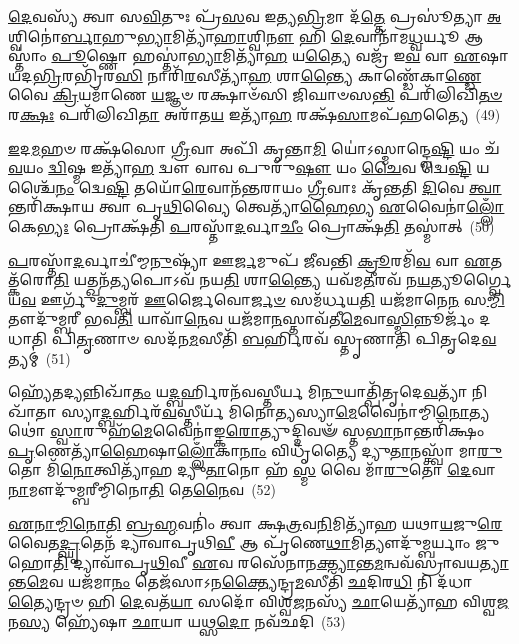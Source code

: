 {\anuvakamend[{𑌪𑌤𑍍𑌨𑍀᳴ 𑌹𑌨𑍍𑌯𑍁𑌰𑍍𑌵𑌾 𑌪𑍃\-\ul{𑌥𑌿}\-𑌵𑍍𑌯𑌾 𑌵𑌿𑌷𑍍𑌯𑍂᳴\-\ul{𑌤𑌂} 𑌵𑌿\-\ul{𑌷𑍍𑌣𑍋𑌃} 𑌷𑌡𑍍𑌵𑌿𑍞᳴𑌶𑌤𑌿𑌶𑍍𑌚}]}%

\-\ul{𑌦𑍇}\-𑌵𑌸𑍍𑌯᳴ 𑌤𑍍𑌵𑌾 𑌸\-\ul{𑌵𑌿}\-𑌤𑍁𑌃 𑌪𑍍𑌰᳴\-\ul{𑌸}\-𑌵 𑌇𑌤𑍍𑌯\-\ul{𑌭𑍍𑌰𑌿}\-𑌮𑌾 𑌦᳴\-\ul{𑌤𑍍𑌤𑍇} 𑌪𑍍𑌰𑌸𑍂॑𑌤𑍍𑌯𑌾 \ul{𑌅}\-𑌶𑍍𑌵𑌿𑌨𑍋॑\-\ul{𑌰𑍍𑌬𑌾}\-𑌹𑍁\-\ul{𑌭𑍍𑌯𑌾}\-𑌮𑌿𑌤𑍍𑌯𑌾᳴\-\ul{𑌹𑌾}\-𑌶𑍍𑌵𑌿\-\ul{𑌨𑍗} 𑌹𑌿 \ul{𑌦𑍇}\-𑌵𑌾𑌨𑌾᳴𑌮\-\ul{𑌧𑍍𑌵}\-𑌰𑍍𑌯𑍂 𑌆𑌸𑍍𑌤𑌾𑌂॑ \ul{𑌪𑍂}\-𑌷𑍍𑌣𑍋 𑌹𑌸𑍍𑌤𑌾॑\-\ul{𑌭𑍍𑌯𑌾}\-𑌮𑌿𑌤𑍍𑌯𑌾᳴\-\ul{𑌹} 𑌯\-\ul{𑌤𑍍𑌯𑍈} 𑌵𑌜𑍍𑌰᳴ 𑌇\-\ul{𑌵} 𑌵𑌾 \ul{𑌏}\-𑌷𑌾 𑌯𑌦\-\ul{𑌭𑍍𑌰𑌿}\-𑌰𑌭𑍍𑌰𑌿᳴𑌰\-\ul{𑌸𑌿} 𑌨𑌾𑌰𑌿᳴\-\ul{𑌰}\-𑌸𑍀𑌤𑍍𑌯𑌾᳴\-\ul{𑌹} 𑌶𑌾\-\ul{𑌨𑍍𑌤𑍍𑌯𑍈} 𑌕𑌾𑌣𑍍𑌡𑍇᳴𑌕𑌾\-\ul{𑌣𑍍𑌡𑍇} 𑌵𑍈 \ul{𑌕𑍍𑌰𑌿}\-𑌯𑌮𑌾᳴𑌣𑍇 \ul{𑌯}\-𑌜𑍍𑌞𑍞 𑌰𑌕𑍍𑌷𑌾𑍞᳴𑌸𑌿 𑌜𑌿𑌘𑌾𑍞𑌸\-\ul{𑌨𑍍𑌤𑌿} 𑌪𑌰𑌿᳴𑌲𑌿𑌖𑌿\-\ul{𑌤}\-\-\ul{𑍞} 𑌰\-\ul{𑌕𑍍𑌷𑌃} 𑌪𑌰𑌿᳴𑌲𑌿𑌖𑌿\-\ul{𑌤𑌾} 𑌅𑌰𑌾᳴𑌤\-\ul{𑌯} 𑌇𑌤𑍍𑌯𑌾᳴\-\ul{𑌹} 𑌰𑌕𑍍𑌷᳴\-\ul{𑌸𑌾}\-𑌮𑌪᳴𑌹𑌤𑍍𑌯𑍈~(49)

\-\ul{𑌇}\-𑌦\-\ul{𑌮}\-𑌹𑍞 𑌰𑌕𑍍𑌷᳴𑌸𑍋 \ul{𑌗𑍍𑌰𑍀}\-𑌵𑌾 𑌅𑌪𑌿᳴ 𑌕𑍃𑌨𑍍𑌤𑌾\-\ul{𑌮𑌿} 𑌯𑍋॑\-𑌽𑌸𑍍𑌮𑌾𑌨𑍍𑌦𑍍𑌵𑍇\-\ul{𑌷𑍍𑌟𑌿} 𑌯𑌂 𑌚᳴ \ul{𑌵}\-𑌯𑌂 \ul{𑌦𑍍𑌵𑌿}\-𑌷𑍍𑌮 𑌇𑌤𑍍𑌯𑌾᳴\-\ul{𑌹} 𑌦𑍍𑌵𑍗 𑌵𑌾𑌵 𑌪𑍁𑌰𑍁᳴\-\ul{𑌷𑍗} 𑌯𑌂 \ul{𑌚𑍈}\-𑌵 𑌦𑍍𑌵𑍇\-\ul{𑌷𑍍𑌟𑌿} 𑌯𑌶𑍍𑌚𑍈᳴\-\ul{𑌨𑌂} 𑌦𑍍𑌵𑍇\-\ul{𑌷𑍍𑌟𑌿} 𑌤𑌯𑍋᳴\-\ul{𑌰𑍇}\-𑌵𑌾𑌨᳴𑌨𑍍𑌤𑌰𑌾𑌯𑌂 \ul{𑌗𑍍𑌰𑍀}\-𑌵𑌾𑌃 𑌕𑍃᳴𑌨𑍍𑌤𑌤𑌿 \ul{𑌦𑌿}\-𑌵𑍇 \ul{𑌤𑍍𑌵𑌾}\-𑌨𑍍𑌤𑌰𑌿᳴𑌕𑍍𑌷𑌾𑌯 𑌤𑍍𑌵𑌾 𑌪𑍃\-\ul{𑌥𑌿}\-𑌵𑍍𑌯𑍈 𑌤𑍍𑌵𑍇𑌤𑍍𑌯𑌾᳴\-\ul{𑌹𑍈}\-𑌭𑍍𑌯 \ul{𑌏}\-𑌵𑍈𑌨𑌾॑\-\ul{𑌲𑍍𑌲𑍋𑌁}\-𑌕𑍇\-\ul{𑌭𑍍𑌯𑌃} 𑌪𑍍𑌰𑍋𑌕𑍍𑌷᳴𑌤𑌿 \ul{𑌪}\-𑌰𑌸𑍍𑌤𑌾᳴\-\ul{𑌦}\-𑌰𑍍𑌵𑌾\-\ul{𑌚𑍀𑌂} 𑌪𑍍𑌰𑍋𑌕𑍍𑌷᳴\-\ul{𑌤𑌿} 𑌤𑌸𑍍𑌮𑌾॑𑌤𑍍~(50)

\-\ul{𑌪}\-𑌰𑌸𑍍𑌤𑌾᳴\-\ul{𑌦}\-𑌰𑍍𑌵𑌾𑌚𑍀॑𑌮𑍍𑌮\-\ul{𑌨𑍁}\-𑌷𑍍𑌯𑌾᳴ 𑌊\-\ul{𑌰𑍍𑌜}\-𑌮𑍁𑌪᳴ 𑌜𑍀𑌵𑌨𑍍𑌤𑌿 \ul{𑌕𑍍𑌰𑍂}\-𑌰𑌮𑌿᳴\-\ul{𑌵} 𑌵𑌾 \ul{𑌏}\-𑌤𑌤𑍍𑌕᳴𑌰𑍋\-\ul{𑌤𑌿} 𑌯𑌤𑍍𑌖𑌨᳴\-\ul{𑌤𑍍𑌯}\-𑌪𑍋\-𑌽𑌵᳴ 𑌨𑌯\-\ul{𑌤𑌿} 𑌶𑌾\-\ul{𑌨𑍍𑌤𑍍𑌯𑍈} 𑌯𑌵᳴𑌮\-\ul{𑌤𑍀}\-𑌰𑌵᳴ 𑌨\-\ul{𑌯}\-𑌤𑍍𑌯𑍂𑌰𑍍𑌗𑍍𑌵𑍈 𑌯\-\ul{𑌵} 𑌊𑌰𑍍𑌗𑍁᳴\-\ul{𑌦𑍁}\-𑌮𑍍𑌬𑌰᳴ \ul{𑌊}\-𑌰𑍍𑌜𑍈𑌵𑍋\-\ul{𑌰𑍍𑌜}\-\-\ul{𑍞} 𑌸𑌮᳴𑌰𑍍𑌧𑌯\-\ul{𑌤𑌿} 𑌯𑌜᳴𑌮𑌾𑌨𑍇\-\ul{𑌨} 𑌸\-\ul{𑌮𑍍𑌮𑌿}\-𑌤𑍗𑌦𑍁᳴𑌮𑍍𑌬𑌰𑍀 𑌭𑌵\-\ul{𑌤𑌿} 𑌯𑌾𑌵𑌾᳴\-\ul{𑌨𑍇}\-𑌵 𑌯𑌜᳴𑌮𑌾\-\ul{𑌨}\-𑌸𑍍𑌤𑌾𑌵᳴𑌤𑍀\-\ul{𑌮𑍇}\-𑌵𑌾\-\ul{𑌸𑍍𑌮𑌿}\-𑌨𑍍𑌨𑍂𑌰𑍍𑌜𑌂᳴ 𑌦𑌧𑌾𑌤𑌿 𑌪𑌿\-\ul{𑌤𑍃}\-𑌣𑌾𑍞 𑌸𑌦᳴𑌨\-\ul{𑌮}\-𑌸𑍀𑌤𑌿᳴ \ul{𑌬}\-𑌰𑍍\mbox{}𑌹𑌿𑌰𑌵᳴ 𑌸𑍍𑌤𑍃𑌣𑌾𑌤𑌿 𑌪𑌿𑌤𑍃𑌦𑍇\-\ul{𑌵}\-𑌤𑍍𑌯𑌮𑍍॑~(51)

𑌹𑍍𑌯𑍇᳴𑌤𑌦𑍍𑌯𑌨𑍍𑌨𑌿𑌖𑌾᳴\-\ul{𑌤𑌂} 𑌯\-\ul{𑌦𑍍𑌬}\-𑌰𑍍\mbox{}𑌹𑌿𑌰𑌨᳴𑌵𑌸𑍍𑌤𑍀𑌰𑍍𑌯 𑌮𑌿\-\ul{𑌨𑍁}\-𑌯𑌾𑌤𑍍𑌪𑌿᳴𑌤𑍃𑌦𑍇\-\ul{𑌵}\-𑌤𑍍𑌯𑌾᳴ 𑌨𑌿𑌖𑌾᳴𑌤𑌾 𑌸𑍍𑌯𑌾\-\ul{𑌦𑍍𑌬}\-𑌰𑍍\mbox{}𑌹𑌿𑌰᳴\-\ul{𑌵}\-𑌸𑍍𑌤𑍀𑌰𑍍𑌯᳴ 𑌮𑌿𑌨𑍋\-\ul{𑌤𑍍𑌯}\-𑌸𑍍𑌯𑌾\-\ul{𑌮𑍇}\-𑌵𑍈𑌨𑌾॑𑌮𑍍𑌮𑌿\-\ul{𑌨𑍋}\-𑌤𑍍𑌯𑌥𑍋॑ \ul{𑌸𑍍𑌵𑌾}\-𑌰𑍁𑌹᳴\-\ul{𑌮𑍇}\-𑌵𑍈𑌨𑌾॑𑌙𑍍𑌕\-\ul{𑌰𑍋}\-𑌤𑍍𑌯𑍁𑌦𑍍𑌦𑌿𑌵𑍟᳴ 𑌸𑍍𑌤\-\ul{𑌭𑌾}\-𑌨𑌾𑌨𑍍𑌤𑌰𑌿᳴𑌕𑍍𑌷𑌂 \ul{𑌪𑍃}\-𑌣𑍇𑌤𑍍𑌯𑌾᳴\-\ul{𑌹𑍈}\-𑌷𑌾\-\ul{𑌲𑍍𑌲𑍋𑌁}\-𑌕𑌾\-\ul{𑌨𑌾𑌂} 𑌵𑌿𑌧𑍃᳴𑌤𑍍𑌯𑍈 𑌦𑍍𑌯𑍁\-\ul{𑌤𑌾}\-𑌨𑌸𑍍𑌤𑍍𑌵𑌾᳴ 𑌮𑌾\-\ul{𑌰𑍁}\-𑌤𑍋 𑌮𑌿᳴\-\ul{𑌨𑍋}\-𑌤𑍍𑌵𑌿𑌤𑍍𑌯𑌾᳴𑌹 𑌦𑍍𑌯𑍁\-\ul{𑌤𑌾}\-𑌨𑍋 𑌹᳴ \ul{𑌸𑍍𑌮} 𑌵𑍈 𑌮𑌾᳴\-\ul{𑌰𑍁}\-𑌤𑍋 \ul{𑌦𑍇}\-𑌵𑌾\-\ul{𑌨𑌾}\-𑌮𑍗𑌦𑍁᳴𑌮𑍍𑌬𑌰𑍀𑌮𑍍𑌮𑌿𑌨𑍋\-\ul{𑌤𑌿} 𑌤𑍇\-\ul{𑌨𑍈}\-𑌵~(52)

\-\ul{𑌏}\-\-\ul{𑌨𑌾}\-\-\ul{𑌮𑍍𑌮𑌿}\-\-\ul{𑌨𑍋}\-\-\ul{𑌤𑌿} \ul{𑌬𑍍𑌰}\-\-\ul{𑌹𑍍𑌮}\-𑌵𑌨𑌿𑌂॑ 𑌤𑍍𑌵𑌾 𑌕𑍍𑌷\-\ul{𑌤𑍍𑌰}\-𑌵\-\ul{𑌨𑌿}\-𑌮𑌿𑌤𑍍𑌯𑌾᳴𑌹 𑌯𑌥𑌾\-\ul{𑌯}\-𑌜𑍁\-\ul{𑌰𑍇}\-𑌵𑍈𑌤\-\ul{𑌦𑍍𑌘𑍃}\-𑌤𑍇𑌨᳴ 𑌦𑍍𑌯𑌾𑌵𑌾𑌪𑍃𑌥𑌿\-\ul{𑌵𑍀} 𑌆 𑌪𑍃᳴𑌣𑍇\-\ul{𑌥𑌾}\-𑌮𑌿𑌤𑍍𑌯𑍗𑌦𑍁᳴𑌮𑍍𑌬𑌰𑍍𑌯𑌾𑌂 𑌜𑍁𑌹𑍋\-\ul{𑌤𑌿} 𑌦𑍍𑌯𑌾𑌵𑌾᳴𑌪𑍃\-\ul{𑌥𑌿}\-𑌵𑍀 \ul{𑌏}\-𑌵 𑌰𑌸𑍇᳴𑌨𑌾𑌨\-\ul{𑌕𑍍𑌤𑍍𑌯𑌾}\-𑌨𑍍𑌤\-\ul{𑌮}\-𑌨𑍍𑌵𑌵᳴𑌸𑍍𑌰𑌾𑌵𑌯\-\ul{𑌤𑍍𑌯𑌾}\-𑌨𑍍𑌤\-\ul{𑌮𑍇}\-𑌵 𑌯𑌜᳴𑌮𑌾\-\ul{𑌨𑌂} 𑌤𑍇𑌜᳴𑌸𑌾\-𑌽𑌨\-\ul{𑌕𑍍𑌤𑍍𑌯𑍈}\-𑌨𑍍𑌦𑍍𑌰\-\ul{𑌮}\-𑌸𑍀𑌤𑌿᳴ \ul{𑌛}\-𑌦𑌿𑌰\-\ul{𑌧𑌿} 𑌨𑌿 𑌦᳴𑌧𑌾\-\ul{𑌤𑍍𑌯𑍈}\-𑌨𑍍𑌦𑍍𑌰𑍞 𑌹𑌿 \ul{𑌦𑍇}\-𑌵𑌤᳴\-\ul{𑌯𑌾} 𑌸𑌦𑍋᳴ 𑌵𑌿𑌶𑍍𑌵\-\ul{𑌜}\-𑌨𑌸𑍍𑌯᳴ \ul{𑌛𑌾}\-𑌯𑍇𑌤𑍍𑌯𑌾᳴𑌹 𑌵𑌿𑌶𑍍𑌵\-\ul{𑌜}\-𑌨\-\ul{𑌸𑍍𑌯} 𑌹𑍍𑌯𑍇᳴𑌷𑌾 \ul{𑌛𑌾}\-𑌯𑌾 𑌯𑌥𑍍𑌸\-\ul{𑌦𑍋} 𑌨𑌵᳴𑌛𑌦𑌿~(53)

